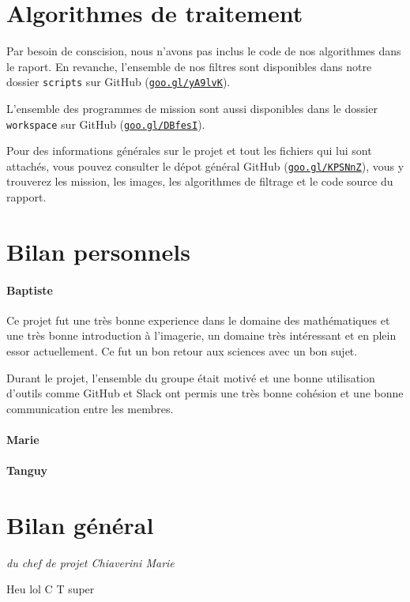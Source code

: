 \documentclass[12pt]{article}
\begin{document}
\section{Algorithmes de traitement}

Par besoin de conscision, nous n'avons pas inclus le code de nos algorithmes dans le raport. En revanche, l'ensemble de nos filtres sont disponibles dans notre dossier \texttt{scripts} sur GitHub (\href{https://github.com/Exia-epickiwi/exolife/tree/master/scripts}{\texttt{goo.gl/yA9lvK}}).

L'ensemble des programmes de mission sont aussi disponibles dans le dossier \texttt{workspace} sur GitHub (\href{https://github.com/Exia-epickiwi/exolife/tree/master/workspace}{\texttt{goo.gl/DBfesI}}).

Pour des informations générales sur le projet et tout les fichiers qui lui sont attachés, vous pouvez consulter le dépot général GitHub (\href{https://github.com/Exia-epickiwi/exolife}{\texttt{goo.gl/KPSNnZ}}), vous y trouverez les mission, les images, les algorithmes de filtrage et le code source du rapport.

\section{Bilan personnels}

\paragraph{ Baptiste} Ce projet fut une très bonne experience dans le domaine des mathématiques et une très bonne introduction à l'imagerie, un domaine très intéressant et en plein essor actuellement. Ce fut un bon retour aux sciences avec un bon sujet.

Durant le projet, l'ensemble du groupe était motivé et une bonne utilisation d'outils comme GitHub et Slack ont permis une très bonne cohésion et une bonne communication entre les membres.

\paragraph{ Marie}


\paragraph{ Tanguy}

\section{Bilan général}
\vspace{-0.5cm}\hspace{0.5cm}\textit{du chef de projet Chiaverini Marie}
\vspace{0.5cm}

Heu lol C T super
\end{document}
